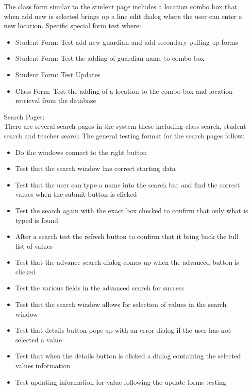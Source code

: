 The class form similar to the student page includes a location combo box that when add new is selected brings up a line edit dialog where the user can enter a new location. Specific special form test where:

\begin{itemize}
\item Student Form: Test add new guardian and add secondary pulling up forms
\item Student Form: Test the adding of guardian name to combo box
\item Student Form: Test Updates
\item Class Form: Test the adding of a location to the combo box and location retrieval from the database
\end{itemize}

Search Pages:\\
There are several search pages in the system these including class search, student search and teacher search
The general testing format for the search pages follow:

\begin{itemize}
\item Do the windows connect to the right button
\item Test that the search window has correct starting data
\item Test that the user can type a name into the search bar and find the correct values when the submit button is clicked
\item Test the search again with the exact box checked to confirm that only what is typed is found
\item After a search test the refresh button to confirm that it bring back the full list of values
\item Test that the advance search dialog comes up when the advanced button is clicked
\item Test the various fields in the advanced search for success
\item Test that the search window allows for selection of values in the search window
\item Test that details button pops up with an error dialog if the user has not selected a value
\item Test that when the details button is clicked a dialog containing the selected values information
\item Test updating information for value following the update forms testing
\end{itemize}

